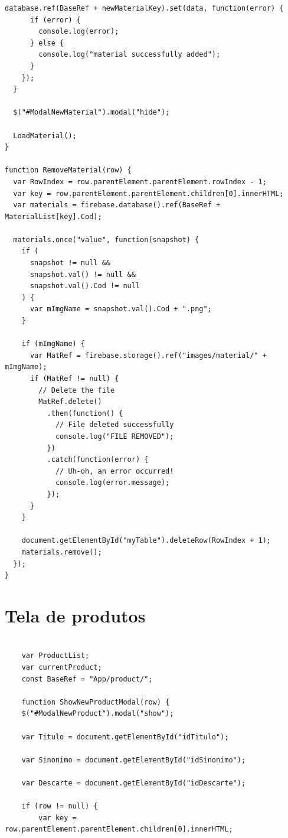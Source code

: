 \documentclass[
	12pt,				%
	openright,			%
	twoside,			%
	a4paper,			%
	english,			%
	french,				%
	spanish,			%
	brazil				%
	]{abntex2}
\begin{document}
\begin{apendicesenv}
\begin{lstlisting}[numbers=none,
basicstyle=\small,
caption={Material.js},
title={Material.js},
label={Material.js}]
    database.ref(BaseRef + newMaterialKey).set(data, function(error) {
      if (error) {
        console.log(error);
      } else {
        console.log("material successfully added");
      }
    });
  }

  $("#ModalNewMaterial").modal("hide");

  LoadMaterial();
}

function RemoveMaterial(row) {
  var RowIndex = row.parentElement.parentElement.rowIndex - 1;
  var key = row.parentElement.parentElement.children[0].innerHTML;
  var materials = firebase.database().ref(BaseRef + MaterialList[key].Cod);

  materials.once("value", function(snapshot) {
    if (
      snapshot != null &&
      snapshot.val() != null &&
      snapshot.val().Cod != null
    ) {
      var mImgName = snapshot.val().Cod + ".png";
    }

    if (mImgName) {
      var MatRef = firebase.storage().ref("images/material/" + mImgName);
      if (MatRef != null) {
        // Delete the file
        MatRef.delete()
          .then(function() {
            // File deleted successfully
            console.log("FILE REMOVED");
          })
          .catch(function(error) {
            // Uh-oh, an error occurred!
            console.log(error.message);
          });
      }
    }

    document.getElementById("myTable").deleteRow(RowIndex + 1);
    materials.remove();
  });
}
\end{lstlisting}
\section{Tela de produtos} \label{cod_produtos}
\begin{lstlisting}[numbers=none,
basicstyle=\small,
caption={Product.js},
title={Product.js},
label={Product.js}]

    var ProductList;
    var currentProduct;
    const BaseRef = "App/product/";

    function ShowNewProductModal(row) {
    $("#ModalNewProduct").modal("show");

    var Titulo = document.getElementById("idTitulo");

    var Sinonimo = document.getElementById("idSinonimo");

    var Descarte = document.getElementById("idDescarte");

    if (row != null) {
        var key = row.parentElement.parentElement.children[0].innerHTML;


\end{lstlisting}
\end{apendicesenv}
\end{document}
